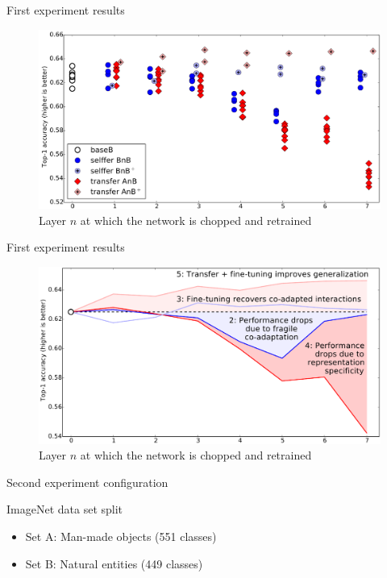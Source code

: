 \documentclass[xcolor=pdftex,dvipsnames,table,mathserif]{beamer}
\begin{document}
\begin{frame}{First experiment results}

  \begin{figure}[ht]
    \centering
    \includegraphics[width=\textwidth]{transfer_learning_res_1}\\
    \scriptsize{Layer $n$ at which the network is chopped and retrained}
  \end{figure}

\end{frame}


\begin{frame}{First experiment results}

  \begin{figure}[ht]
    \centering
    \includegraphics[width=\textwidth]{transfer_learning_res_2}\\
    \scriptsize{Layer $n$ at which the network is chopped and retrained}
  \end{figure}


\end{frame}

\begin{frame}{Second experiment configuration}

  \begin{block}{ImageNet data set split}
    \begin{itemize}
    \item Set A: Man-made objects (551 classes)
    \item Set B: Natural entities (449 classes)
    \end{itemize}
  \end{block}

\end{frame}
\end{document}
